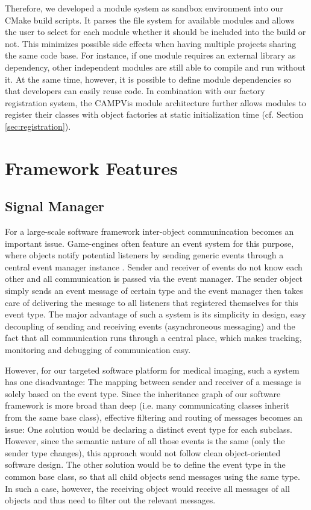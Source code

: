 Therefore, we developed a module system as sandbox environment into our CMake build scripts.
It parses the file system for available modules and allows the user to select for each module whether it should be included into the build or not.
This minimizes possible side effects when having multiple projects sharing the same code base.
For instance, if one module requires an external library as dependency, other independent modules are still able to compile and run without it.
At the same time, however, it is possible to define module dependencies so that developers can easily reuse code.
In combination with our factory registration system, the CAMPVis module architecture further allows modules to register their classes with object factories at static initialization time (cf. Section \ref{sec:registration}).



\section{Framework Features}
\label{sec:features}


\subsection{Signal Manager}
For a large-scale software framework inter-object communincation becomes an important issue. 
Game-engines often feature an event system for this purpose, where objects notify potential listeners by sending generic events through a central event manager instance \cite{mcshaffry2003game}.
Sender and receiver of events do not know each other and all communication is passed via the event manager. The sender object simply sends an event message of certain type and the event manager then takes care of delivering the message to all listeners that registered themselves for this event type.
The major advantage of such a system is its simplicity in design, easy decoupling of sending and receiving events (asynchroneous messaging) and the fact that all communication runs through a central place, which makes tracking, monitoring and debugging of communication easy.

However, for our targeted software platform for medical imaging, such a system has one disadvantage: The mapping between sender and receiver of a message is solely based on the event type.
Since the inheritance graph of our software framework is more broad than deep (i.e. many communicating classes inherit from the same base class), effective filtering and routing of messages becomes an issue:
One solution would be declaring a distinct event type for each subclass.
However, since the semantic nature of all those events is the same (only the sender type changes), this approach would not follow clean object-oriented software design.
The other solution would be to define the event type in the common base class, so that all child objects send messages using the same type.
In such a case, however, the receiving object would receive all messages of all objects and thus need to filter out the relevant messages.

